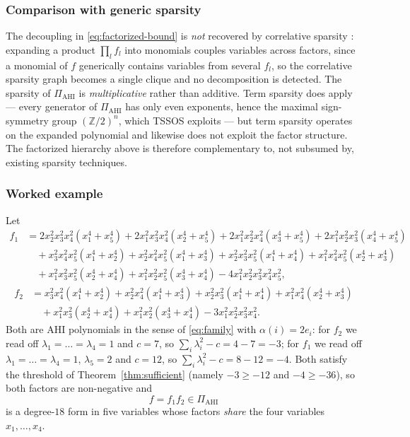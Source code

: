 \documentclass[12pt]{elsarticle}
\theoremstyle{definition}
\newcommand{\AHI}{\mathrm{AHI}}
\newcommand{\PiAHI}{\Pi_{\AHI}}
\begin{document}
\subsubsection{Comparison with generic sparsity}\label{subsubsec:sparsity}

The decoupling in \eqref{eq:factorized-bound} is \emph{not} recovered by correlative sparsity \citep{waki2006sums}: expanding a product $\prod_l f_l$ into monomials couples variables across factors, since a monomial of $f$ generically contains variables from several $f_l$, so the correlative sparsity graph becomes a single clique and no decomposition is detected. The sparsity of $\PiAHI$ is \emph{multiplicative} rather than additive. Term sparsity \citep{wang2021tssos} does apply --- every generator of $\PiAHI$ has only even exponents, hence the maximal sign-symmetry group $(\mathbb{Z}/2)^{n}$, which TSSOS exploits --- but term sparsity operates on the expanded polynomial and likewise does not exploit the factor structure. The factorized hierarchy above is therefore complementary to, not subsumed by, existing sparsity techniques.

\subsubsection{Worked example}\label{subsubsec:worked}

Let
\[
\begin{aligned}
f_1 &= 2x_2^2x_3^2x_4^2(x_1^4+x_5^4) + 2x_1^2x_3^2x_4^2(x_2^4+x_5^4)
     + 2x_1^2x_2^2x_4^2(x_3^4+x_5^4) + 2x_1^2x_2^2x_3^2(x_4^4+x_5^4)\\
    &\quad + x_3^2x_4^2x_5^2(x_1^4+x_2^4) + x_2^2x_4^2x_5^2(x_1^4+x_3^4)
     + x_2^2x_3^2x_5^2(x_1^4+x_4^4) + x_1^2x_4^2x_5^2(x_2^4+x_3^4)\\
    &\quad + x_1^2x_3^2x_5^2(x_2^4+x_4^4) + x_1^2x_2^2x_5^2(x_3^4+x_4^4)
     - 4x_1^2x_2^2x_3^2x_4^2x_5^2,
\end{aligned}
\]
\[
\begin{aligned}
f_2 &= x_3^2x_4^2(x_1^4+x_2^4) + x_2^2x_4^2(x_1^4+x_3^4)
     + x_2^2x_3^2(x_1^4+x_4^4) + x_1^2x_4^2(x_2^4+x_3^4)\\
    &\quad + x_1^2x_3^2(x_2^4+x_4^4) + x_1^2x_2^2(x_3^4+x_4^4)
     - 3x_1^2x_2^2x_3^2x_4^2.
\end{aligned}
\]
Both are AHI polynomials in the sense of \eqref{eq:family} with $\alpha(i)=2e_i$: for $f_2$ we read off $\lambda_1=\dots=\lambda_4=1$ and $c=7$, so $\sum_i\lambda_i^2-c = 4-7 = -3$; for $f_1$ we read off $\lambda_1=\dots=\lambda_4=1$, $\lambda_5=2$ and $c=12$, so $\sum_i\lambda_i^2-c = 8-12 = -4$. Both satisfy the threshold of Theorem~\ref{thm:sufficient} (namely $-3\ge -12$ and $-4\ge -36$), so both factors are non-negative and
\[
f = f_1 f_2 \in \PiAHI
\]
is a degree-$18$ form in five variables whose factors \emph{share} the four variables $x_1,\dots,x_4$.
\end{document}
